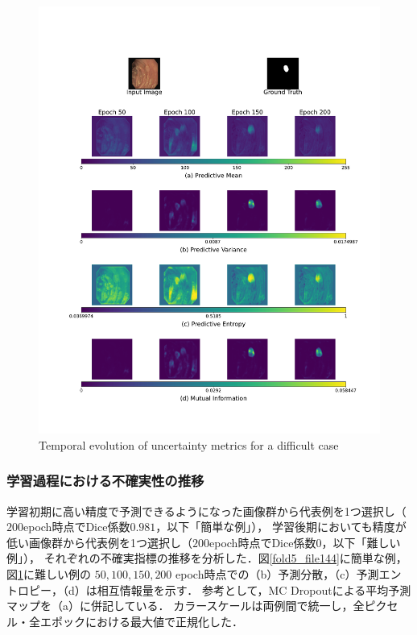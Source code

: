 \documentclass[10pt, a4paper, twocolumn]{jarticle}
\begin{document}
\begin{figure}[t] %
  \begin{center}
    \includegraphics[width=\hsize]{figure/fold2_file450_uncertainty_evolution.pdf}
    \caption{Temporal evolution of uncertainty metrics for a difficult case}
    \label{fold2_file450}
  \end{center}
\end{figure}


\subsubsection{学習過程における不確実性の推移}
学習初期に高い精度で予測できるようになった画像群から代表例を1つ選択し（$200$epoch時点でDice係数$0.981$，以下「簡単な例」），
学習後期においても精度が低い画像群から代表例を1つ選択し（$200$epoch時点でDice係数$0$，以下「難しい例」），
それぞれの不確実指標の推移を分析した．図\ref{fold5_file144}に簡単な例，図\ref{fold2_file450}に難しい例の
$50, 100, 150, 200$ epoch時点での（b）予測分散，（c）予測エントロピー，（d）は相互情報量を示す．
参考として，MC Dropoutによる平均予測マップを（a）に併記している．
カラースケールは両例間で統一し，全ピクセル・全エポックにおける最大値で正規化した．
\end{document}
